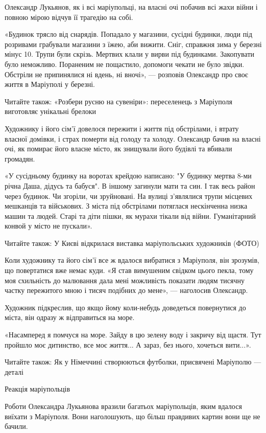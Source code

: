 Олександр Лукьянов, як і всі маріупольці, на власні очі побачив всі жахи війни
і повною мірою відчув її трагедію на собі.

«Будинок трясло від снарядів. Попадало у магазини, сусідні будинки, люди під
розривами грабували магазини з їжею, аби вижити. Сніг, справжня зима у березні
мінус 10. Трупи були скрізь. Мертвих клали у вирви під будинками. Закопувати
було неможливо. Пораненим не пощастило, допомоги чекати не було звідки.
Обстріли не припинялися ні вдень, ні вночі», — розповів Олександр про своє
життя в Маріуполі у березні.

Читайте також: «Розбери русню на сувеніри»: переселенець з Маріуполя виготовляє
унікальні брелоки

Художнику і його сім'ї довелося пережити і життя під обстрілами, і втрату
власної домівки, і страх померти від голоду та холоду. Олександр бачив на
власні очі, як помирає його власне місто, як знищували його будівлі та вбивали
громадян.

«У сусідньому будинку на воротах крейдою написано: "У будинку мертва 8-ми річна
Даша, дідусь та бабуся". В іншому загинули мати та син. І так весь район через
будинок. Чи згоріли, чи зруйновані. На вулиці з'являлися трупи місцевих
мешканців та військових. З міста під обстрілами потяглася нескінченна низка
машин та людей. Старі та діти пішки, як мурахи тікали від війни. Гуманітарний
конвой у місто не пускали».

Читайте також: У Києві відкрилася виставка маріупольських художників (ФОТО)

Коли художнику та його сім'ї все ж вдалося вибратися з Маріуполя, він зрозумів,
що повертатися вже немає куди.  «Я став вимушеним свідком цього пекла, тому моя
схильність до малювання дала мені можливість показати людям тисячну частку
пережитого мною і тисяч подібних до мене», — наголосив Олександр.

Художник підкреслив, що якщо йому коли-небудь доведеться повернутися до міста,
він одразу ж відправиться на море.

«Насамперед я помчуся на море. Зайду в цю зелену воду і закричу від щастя. Тут
пройшло моє дитинство, все моє життя... А зараз, без нього, хочеться вити...».

Читайте також: Як у Німеччині створюються футболки, присвячені Маріуполю —
деталі

Реакція маріупольців

Роботи Олександра Лукьянова вразили багатьох маріупольців, яким вдалося виїхати
з Маріуполя. Вони наголошують, що більш правдивих картин вони ще не бачили.

